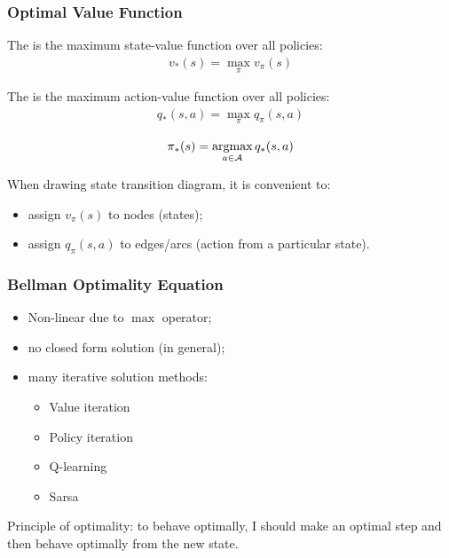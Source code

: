 
\subsubsection{Optimal Value Function}

The  is the maximum state-value function over all policies:
\begin{align*}
	v_*(s) = \max_{\pi} v_{\pi}(s)
\end{align*}

The   is the maximum action-value function over all policies:
\begin{align*}
	q_*(s, a) = \max_{\pi} q_{\pi}(s, a)
\end{align*}

\begin{align*}
	\pi_*(s) = \operatorname*{argmax}_{a\in \mathcal{A}} q_*(s,a)
\end{align*}

\begin{notebox}
	When drawing state transition diagram, it is convenient to:
	\begin{itemize}
		\item assign $v_{\pi}(s)$ to nodes (states);
		\item assign $q_{\pi}(s, a)$ to edges/arcs (action from a particular state).
	\end{itemize}
\end{notebox}

\subsubsection{Bellman Optimality Equation}
\begin{itemize}
	\item Non-linear due to $\max$ operator;
	\item no closed form solution (in general);
	\item many iterative solution methods:
	\begin{itemize}
		\item Value iteration
		\item Policy iteration
		\item Q-learning
		\item Sarsa
	\end{itemize} 
\end{itemize}

Principle of optimality: to behave optimally, I should make an optimal step and then behave optimally from the new state. 
